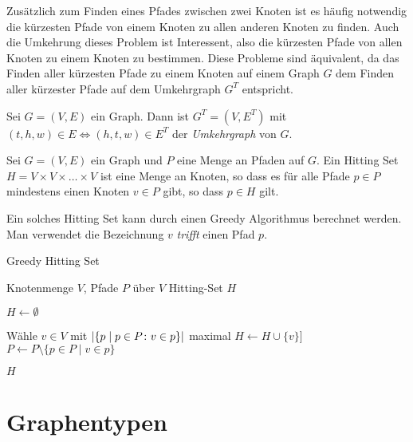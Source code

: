 Zusätzlich zum Finden eines Pfades zwischen zwei Knoten ist es häufig notwendig die kürzesten Pfade von einem Knoten zu allen anderen Knoten zu finden.
Auch die Umkehrung dieses Problem ist Interessent, also die kürzesten Pfade von allen Knoten zu einem Knoten zu bestimmen.
Diese Probleme sind äquivalent, da das Finden aller kürzesten Pfade zu einem Knoten auf einem Graph $G$ dem Finden aller kürzester Pfade auf dem Umkehrgraph $G^T$ entspricht.

\begin{definition}[Umkehrgraph]
    Sei $G = (V, E)$ ein Graph. Dann ist $G^T = (V, E^T)$ mit $(t, h, w) \in E \Leftrightarrow (h, t, w) \in E^T$ der \emph{Umkehrgraph} von $G$.
\end{definition}


\begin{definition}
    Sei $G = (V, E)$ ein Graph und $P$ eine Menge an Pfaden auf $G$.
    Ein Hitting Set $H = V \times V \times \dotsc \times V$ ist eine Menge an Knoten, so dass es für alle Pfade $p \in P$ mindestens einen Knoten $v \in P$ gibt, so dass $p \in H$ gilt.
\end{definition}

Ein solches Hitting Set kann durch einen Greedy Algorithmus berechnet werden.
Man verwendet die Bezeichnung $v$ \emph{trifft} einen Pfad $p$.

\begin{algorithm}
    \caption{Greedy Hitting Set}
    \begin{algorithmic}[1]
        \Require Knotenmenge $V$, Pfade $P$ über $V$
        \Ensure Hitting-Set $H$

        \State $H \gets \emptyset$

        \State

        \State Wähle $v \in V$ mit $\abs{ \{ p \mid p \in P \colon v \in p \}}$ maximal
        \State $H \gets H \cup \{  v \}]$
        \State $P \gets P \setminus \{p \in P \mid v \in p\}$
        \EndWhile

        \State

        \State \Return $H$
    \end{algorithmic}
\end{algorithm}


\section{Graphentypen}
